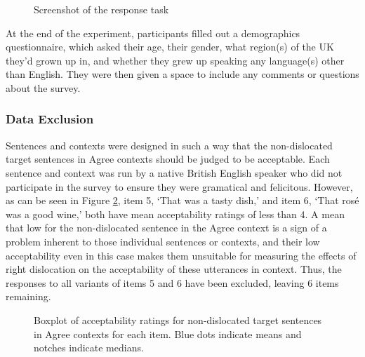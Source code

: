 \documentclass[titlepage,12pt]{article}
\begin{document}
\begin{figure}[hbt]
\centering
{}
\caption{Screenshot of the response task}
\label{screenshot}
\end{figure}

At the end of the experiment, participants filled out a demographics questionnaire, which asked their age, their gender, what region(s) of the UK they'd grown up in, and whether they grew up speaking any language(s) other than English. They were then given a space to include any comments or questions about the survey.

\subsubsection{Data Exclusion}

Sentences and contexts were designed in such a way that the non-dislocated target sentences in Agree contexts should be judged to be acceptable. Each sentence and context was run by a native British English speaker who did not participate in the survey to ensure they were gramatical and felicitous. However, as can be seen in Figure \ref{itemNDa}, item 5, `That was a tasty dish,' and item 6, `That rosé was a good wine,' both have mean acceptability ratings of less than 4. A mean that low for the non-dislocated sentence in the Agree context is a sign of a problem inherent to those individual sentences or contexts, and their low acceptability even in this case makes them unsuitable for measuring the effects of right dislocation on the acceptability of these utterances in context. Thus, the responses to all variants of items 5 and 6 have been excluded, leaving 6 items remaining.

\begin{figure}[hbt]
\centering
{}
\caption{Boxplot of acceptability ratings for non-dislocated target sentences in Agree contexts for each item. Blue dots indicate means and notches indicate medians.}
\label{itemNDa}
\end{figure}
\end{document}
